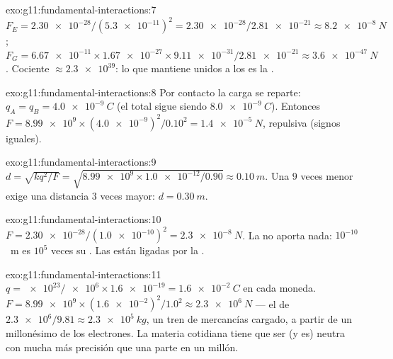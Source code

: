 \begin{solution}{exo:g11:fundamental-interactions:7}
$F_E = \num{2.30e-28}/(\num{5.3e-11})^2 = \num{2.30e-28}/\num{2.81e-21}
\approx \qty{8.2e-8}{N}$;
$F_G = \num{6.67e-11} \times \num{1.67e-27} \times \num{9.11e-31} /
\num{2.81e-21} \approx \qty{3.6e-47}{N}$. Cociente
$\approx \num{2.3e39}$: lo que mantiene unidos a los  es la
.
\end{solution}

\begin{solution}{exo:g11:fundamental-interactions:8}
Por contacto la carga se reparte: $q_A = q_B = \qty{+4.0e-9}{C}$ (el
total sigue siendo $\qty{8.0e-9}{C}$). Entonces
$F = \num{8.99e9} \times (\num{4.0e-9})^2/0.10^2 = \qty{1.4e-5}{N}$,
repulsiva (signos iguales).
\end{solution}

\begin{solution}{exo:g11:fundamental-interactions:9}
$d = \sqrt{k q^2/F} = \sqrt{\num{8.99e9} \times \num{1.0e-12}/0.90}
\approx \qty{0.10}{m}$. Una  $9$ veces menor exige una distancia
$3$ veces mayor: $d = \qty{0.30}{m}$.
\end{solution}

\begin{solution}{exo:g11:fundamental-interactions:10}
$F = \num{2.30e-28}/(\num{1.0e-10})^2 = \qty{2.3e-8}{N}$. La  no aporta nada: $10^{-10}$~m es $10^{5}$ veces su . Las
 están ligadas por la .
\end{solution}

\begin{solution}{exo:g11:fundamental-interactions:11}
$q = \num{e23}/\num{e6} \times \num{1.6e-19} = \qty{1.6e-2}{C}$ en cada
moneda. $F = \num{8.99e9} \times (\num{1.6e-2})^2/1.0^2 \approx
\qty{2.3e6}{N}$ --- el  de
$\num{2.3e6}/9.81 \approx \qty{2.3e5}{kg}$, un tren de mercancías
cargado, a partir de un millonésimo de los electrones. La materia
cotidiana tiene que ser (y es) neutra con mucha más precisión que una
parte en un millón.
\end{solution}

